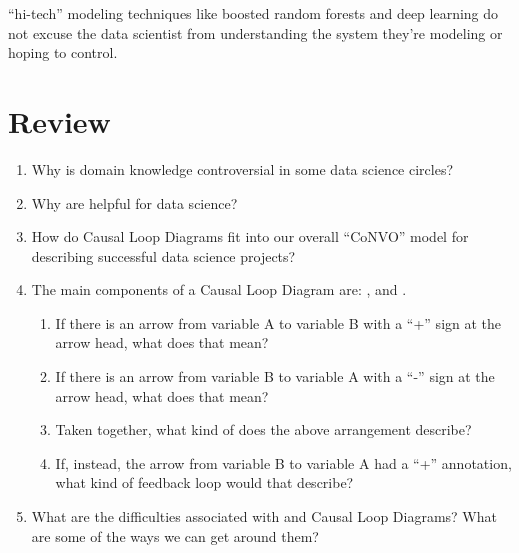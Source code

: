 \documentclass[letterpaper,10pt,english]{sphinxmanual}
\begin{document}
“hi-tech” modeling techniques like boosted random forests and deep learning do not excuse the data scientist from understanding the system they’re modeling or hoping to control.


\section{Review}
\label{\detokenize{index:Review}}\begin{enumerate}
\def\theenumi{\arabic{enumi}}
\def\labelenumi{\theenumi .}
\makeatletter\def\p@enumii{\p@enumi \theenumi .}\makeatother
\item {} 
Why is domain knowledge controversial in some data science circles?

\item {} 
Why are  helpful for data science?

\item {} 
How do Causal Loop Diagrams fit into our overall “CoNVO” model for describing successful data science projects?

\item {} 
The main components of a Causal Loop Diagram are: ,  and .
\begin{enumerate}
\def\theenumii{\arabic{enumii}}
\def\labelenumii{\theenumii .}
\makeatletter\def\p@enumiii{\p@enumii \theenumii .}\makeatother
\item {} 
If there is an arrow from variable A to variable B with a “+” sign at the arrow head, what does that mean?

\item {} 
If there is an arrow from variable B to variable A with a “-” sign at the arrow head, what does that mean?

\item {} 
Taken together, what kind of  does the above arrangement describe?

\item {} 
If, instead, the arrow from variable B to variable A had a “+” annotation, what kind of feedback loop would that describe?

\end{enumerate}

\item {} 
What are the difficulties associated with  and Causal Loop Diagrams? What are some of the ways we can get around them?

\end{enumerate}
\end{document}
